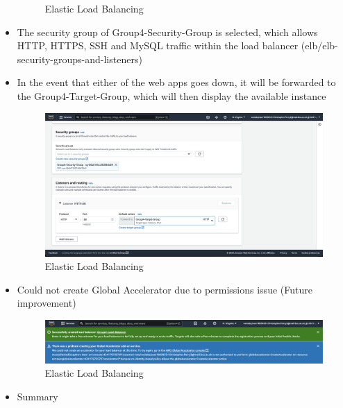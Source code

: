 \begin{itemize}
\begin{figure}[!htbp]
                                                                       \caption{Elastic Load Balancing}
                                                                       \label{fig:elb-networ-mapping}
    \end{figure}
    \item The security group of Group4-Security-Group is selected, which allows HTTP, HTTPS, SSH and MySQL traffic within
    the load balancer (elb/elb-security-groups-and-listeners)
    \item In the event that either of the web apps goes down, it will be forwarded to the Group4-Target-Group, which will then
    display the available instance \begin{figure}[!htbp]
                                                 \centering
                                                 \includegraphics[width=\textwidth]{resources/elb/elb-security-groups-and-listeners.png}
                                                 \caption{Elastic Load Balancing}
                                                 \label{fig:elb-security-groups}
    \end{figure}
    \item Could not create Global Accelerator due to permissions issue (Future improvement)
    \begin{figure}[!htbp]
        \centering
        \includegraphics[width=\textwidth]{resources/elb/elb-accelerator.png}
        \caption{Elastic Load Balancing}
        \label{fig:elb-accelerators}
    \end{figure}
    \item Summary


\end{itemize}
